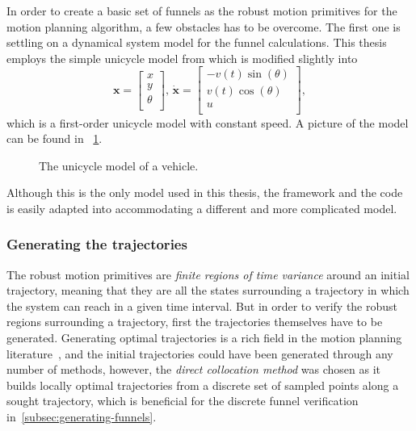 In order to create a basic set of funnels as the robust motion primitives for
the \rrtfunnel{} motion planning algorithm, a few obstacles has to be overcome.
The first one is settling on a dynamical system model for the funnel
calculations. This thesis employs the simple unicycle model from
\cite[LaValle.p~613]{Lav06} which is modified slightly into
\begin{equation}
  \label{eq:model-dynamics}
  \mathbf{x} =
  \begin{bmatrix}
    x \\ y \\ \theta \\
  \end{bmatrix}, \, \dot{\mathbf{x}} =
  \begin{bmatrix}
    -v(t)\sin(\theta) \\
    v(t)\cos(\theta) \\
    u \\
  \end{bmatrix},
\end{equation}
which is a first-order unicycle model with constant speed. A picture of the
model can be found in ~\cref{fig:second-order-unicycle}.
\begin{figure}
  \caption{The unicycle model of a vehicle.}
  \label{fig:second-order-unicycle}
\end{figure}
Although this is the only model used in this thesis, the framework and the code
is easily adapted into accommodating a different and more complicated model.

\subsubsection{Generating the trajectories}

The robust motion primitives are \textit{finite regions of time variance} around
an initial trajectory, meaning that they are all the states surrounding a
trajectory in which the system can reach in a given time interval. But in order
to verify the robust regions surrounding a trajectory, first the trajectories
themselves have to be generated. Generating optimal trajectories is a rich field
in the motion planning literature~\cite{Betts_1998}, and the initial
trajectories could have been generated through any number of methods, however,
the \textit{direct collocation method} was chosen as it builds locally optimal
trajectories from a discrete set of sampled points along a sought trajectory,
which is beneficial for the discrete funnel verification
in~\cref{subsec:generating-funnels}.


